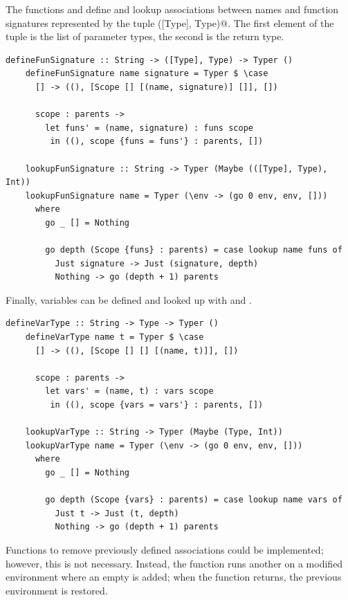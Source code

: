 \documentclass[UdineBachThesis,american,11pt]{PhdThesis}
\begin{document}
  The functions \lstinline@defineFunSignature@ and
  \lstinline@lookupFunSignature@ define and lookup associations between names
  and function signatures represented by the tuple \lstinline@([Type], Type)@.
  The first element of the tuple is the list of parameter types, the second is
  the return type.

  \begin{lstlisting}[gobble=4,basicstyle=\ttfamily\small]
    defineFunSignature :: String -> ([Type], Type) -> Typer ()
    defineFunSignature name signature = Typer $ \case
      [] -> ((), [Scope [] [(name, signature)] []], [])

      scope : parents ->
        let funs' = (name, signature) : funs scope
         in ((), scope {funs = funs'} : parents, [])

    lookupFunSignature :: String -> Typer (Maybe (([Type], Type), Int))
    lookupFunSignature name = Typer (\env -> (go 0 env, env, []))
      where
        go _ [] = Nothing

        go depth (Scope {funs} : parents) = case lookup name funs of
          Just signature -> Just (signature, depth)
          Nothing -> go (depth + 1) parents
  \end{lstlisting}

  \newpage

  Finally, variables can be defined and looked up with \lstinline@defineVarType@
  and \lstinline@lookupVarType@.

  \begin{lstlisting}[gobble=4,basicstyle=\ttfamily\small]
    defineVarType :: String -> Type -> Typer ()
    defineVarType name t = Typer $ \case
      [] -> ((), [Scope [] [] [(name, t)]], [])

      scope : parents ->
        let vars' = (name, t) : vars scope
         in ((), scope {vars = vars'} : parents, [])

    lookupVarType :: String -> Typer (Maybe (Type, Int))
    lookupVarType name = Typer (\env -> (go 0 env, env, []))
      where
        go _ [] = Nothing

        go depth (Scope {vars} : parents) = case lookup name vars of
          Just t -> Just (t, depth)
          Nothing -> go (depth + 1) parents
  \end{lstlisting}

  Functions to remove previously defined associations could be implemented;
  however, this is not necessary. Instead, the function \lstinline@withNewScope@
  runs another \lstinline@Typer@ on a modified environment where an empty
  \lstinline@Scope@ is added; when the function returns, the previous
  environment is restored.
\end{document}
